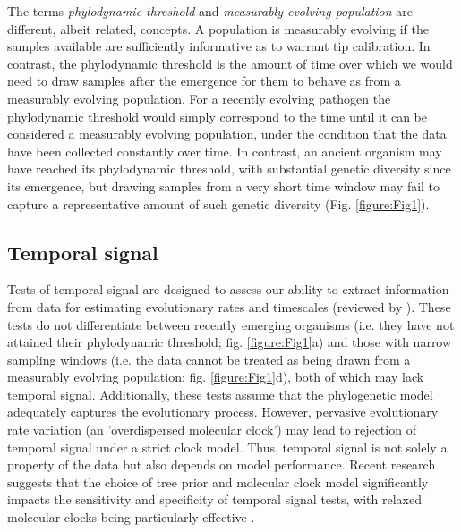 \documentclass[11pt]{article}
\begin{document}
The terms \textit{phylodynamic threshold} and \textit{measurably evolving population} are different, albeit related, concepts. A population is measurably evolving if the samples available are sufficiently informative as to warrant tip calibration. In contrast, the phylodynamic threshold is the amount of time over which we would need to draw samples after the emergence for them to behave as from a measurably evolving population. For a recently evolving pathogen the phylodynamic threshold would simply correspond to the time until it can be considered a measurably evolving population, under the condition that the data have been collected constantly over time. In contrast, an ancient organism may have reached its phylodynamic threshold, with substantial genetic diversity since its emergence, but drawing samples from a very short time window may fail to capture a representative amount of such genetic diversity (Fig. \ref{figure:Fig1}).

\subsection{Temporal signal}
Tests of temporal signal are designed to assess our ability to extract information from data for estimating evolutionary rates and timescales (reviewed by \cite{rieux2016inferences}). These tests do not differentiate between recently emerging organisms (i.e. they have not attained their phylodynamic threshold; fig. \ref{figure:Fig1}a) and those with narrow sampling windows (i.e. the data cannot be treated as being drawn from a measurably evolving population; fig. \ref{figure:Fig1}d), both of which may lack temporal signal. Additionally, these tests assume that the phylogenetic model adequately captures the evolutionary process. However, pervasive evolutionary rate variation (an 'overdispersed molecular clock') may lead to rejection of temporal signal under a strict clock model. Thus, temporal signal is not solely a property of the data but also depends on model performance. Recent research suggests that the choice of tree prior and molecular clock model significantly impacts the sensitivity and specificity of temporal signal tests, with relaxed molecular clocks being particularly effective \citep{tay2024assessing}.
\end{document}
